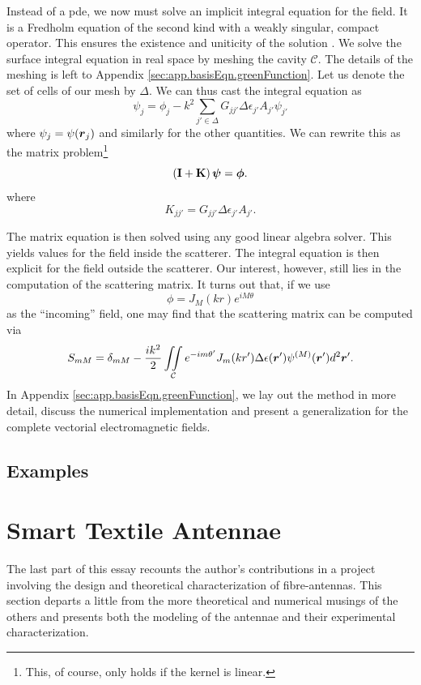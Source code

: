 Instead of a \gls{pde}, we now must solve an implicit 
integral equation for the field. It is a Fredholm 
equation of the second kind with a weakly singular, compact
operator. This ensures the existence
and uniticity of the solution \cite{GOH1981,COL2013}.
We solve the surface integral equation in real space by meshing
the cavity $\mathcal{C}$. The details of the meshing is left to 
Appendix \ref{sec:app.basisEqn.greenFunction}. Let us denote the set
of cells of our mesh by $\Delta$. We can thus cast the integral
equation as
	\begin{equation}
		\psi_j = \phi_j -k^2\sum_{j'\in\Delta} G_{jj'}\Delta\epsilon_{j'}A_{j'}\psi_{j'}
	\end{equation}
where $\psi_j=\psi(\boldsymbol{r}_j)$ and similarly for the other quantities. We can
rewrite this as the matrix problem\footnote{This, of course, only holds if the
kernel is linear.} 
	\begin{equation}
		\left(\mathbf{I}+\mathbf{K}\right)\boldsymbol{\psi}=\boldsymbol{\phi}.
	\end{equation}
where 
	\begin{equation}
		K_{jj'} = G_{jj'}\Delta\epsilon_{j'}A_{j'}.
	\end{equation}

The matrix equation is then solved using any good 
linear algebra solver. This yields values for the
field inside the scatterer. The integral equation
is then explicit for the field outside the scatterer. 
Our interest, however, still lies in the computation
of the scattering matrix. It turns out that, if we
use 
	\begin{equation}
		\phi = J_M(kr)e^{iM\theta}
	\end{equation}
as the ``incoming'' field, one may find that the scattering
matrix can be computed via
	\begin{equation}
		S_{mM} = \delta_{mM} - \frac{ik^2}{2}\mathop{\iint}_\mathcal{C}e^{-im{\theta'}}J_m(kr')\Delta\epsilon(\boldsymbol{r}')\psi^{(M)}(\boldsymbol{r}')d^2\boldsymbol{r}'.
	\end{equation}
In Appendix \ref{sec:app.basisEqn.greenFunction}, we lay out the method in more detail, 
discuss the numerical implementation and present a generalization for the complete 
vectorial electromagnetic fields.

\subsection{Examples}

\section{Smart Textile Antennae}
The last part of this essay recounts the author's contributions
in a project involving the design and theoretical characterization
of fibre-antennas. This section departs a little from the more theoretical
and numerical musings of the others and presents both the modeling of the 
antennae and their experimental characterization.   

